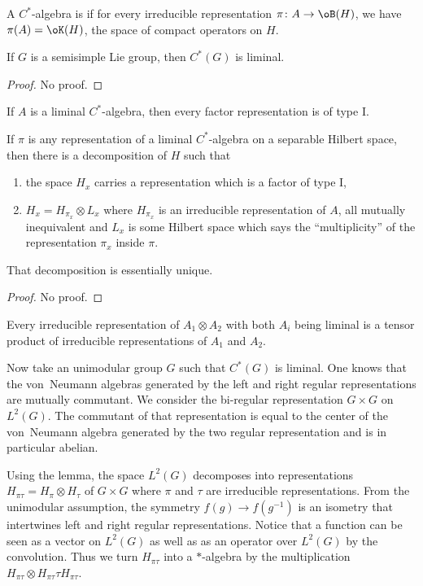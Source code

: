 A $C^*$-algebra is  if for every irreducible representation $\pi\colon A\to \oB(H)$, we have $\pi(A)=\oK(H)$, the space of compact operators on $H$.

\begin{theorem}
If $G$ is a semisimple Lie group, then $C^*(G)$ is liminal.
\end{theorem}
\begin{proof}
No proof.
\end{proof}

\begin{theorem}
If $A$ is a liminal $C^*$-algebra, then every factor representation is of type I.
\end{theorem}

\begin{theorem}
	If $\pi$ is any representation of a liminal $C^*$-algebra on a separable Hilbert space, then there is a decomposition of $H$ such that
	\begin{enumerate}
		\item the space $H_x$ carries a representation which is a factor of type I,
		\item $H_x=H_{\pi_x}\otimes L_x$ where $H_{\pi_x}$ is an irreducible representation of $A$, all mutually inequivalent and $L_x$ is some Hilbert space which says the ``multiplicity'' of the representation $\pi_x$ inside $\pi$.
	\end{enumerate}
	That decomposition is essentially unique.
\end{theorem}

\begin{proof}
No proof.
\end{proof}

\begin{lemma}
Every irreducible representation of $A_1\otimes A_2$ with both $A_i$ being liminal is a tensor product of irreducible representations of $A_1$ and $A_2$.
\end{lemma}

Now take an unimodular group $G$ such that $C^*(G)$ is liminal. One knows that the von~Neumann algebras generated by the left and right regular representations are mutually commutant. We consider the bi-regular representation $G\times G$ on $L^2(G)$. The commutant of that representation is equal to the center of the von~Neumann algebra generated by the two regular representation and is in particular abelian.

Using the lemma, the space $ L^2(G)$ decomposes into representations $H_{\pi\tau}=H_{\pi}\otimes H_{\tau}$ of $G\times G$ where $\pi$ and $\tau$ are irreducible representations. From the unimodular assumption, the symmetry $f(g)\to f(g^{-1})$ is an isometry that intertwines left and right regular representations. Notice that a function can be seen as a vector on $L^2(G)$ as well as as an operator over $L^2(G)$ by the convolution. Thus we turn $H_{\pi\tau}$ into a $*$-algebra by the multiplication $H_{\pi\tau}\otimes H_{\pi\tau}\tau H_{\pi\tau}$.

